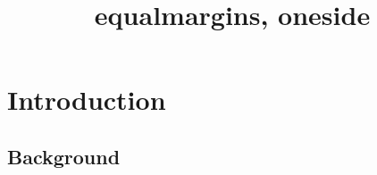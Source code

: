 \documentclass[
  equalmargins,
  oneside,
  a5paper,
]{ut-thesis}
\title{equalmargins, oneside}
\begin{document}
  \maketitle
  \chapter{Introduction}
  \lipsum[1-2]
  \section{Background}
  \lipsum[3-4]
\end{document}
